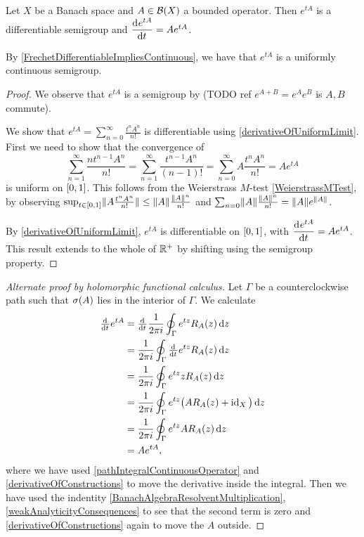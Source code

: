 \begin{proposition} \label{exponentialDifferentiableSemigroup}
Let $X$ be a Banach space and $A\in\operatorname{\mathcal{B}}(X)$ a bounded operator. Then $e^{tA}$ is a differentiable semigroup and $\mathinner{ \dfrac{\operatorname{d \!}{^{}}e^{tA}}{\operatorname{d \!}{{t}^{}}} } = Ae^{tA}$.
\end{proposition}
By \ref{FrechetDifferentiableImpliesContinuous}, we have that $e^{tA}$ is a uniformly continuous semigroup.
\begin{proof}
We observe that $e^{tA}$ is a semigroup by (TODO ref $e^{A+B} = e^Ae^B$ is $A,B$ commute).

We show that $e^{tA} = \sum_{n=0}^\infty \frac{t^nA^n}{n!}$ is differentiable using \ref{derivativeOfUniformLimit}. First we need to show that the convergence of
\[ \sum_{n=1}^\infty \frac{nt^{n-1}A^n}{n!} = \sum_{n=1}^\infty \frac{t^{n-1}A^n}{(n-1)!} = \sum_{n=0}^\infty A\frac{t^{n}A^n}{n!} = Ae^{tA} \]
is uniform on $\interval{0,1}$. This follows from the Weierstrass $M$-test \ref{WeierstrassMTest}, by observing $\sup_{t\in \interval{0,1}}\norm{A\frac{t^{n}A^n}{n!}} \leq \norm{A}\frac{\norm{A}^n}{n!}$ and $\sum_{n=0} \lVert A\rVert\frac{\lVert A\rVert^n}{n!} = \lVert A\rVert e^{\lVert A\rVert}$.

By \ref{derivativeOfUniformLimit}, $e^{tA}$ is differentiable on $\interval{0,1}$, with $\mathinner{ \dfrac{\operatorname{d \!}{^{}}e^{tA}}{\operatorname{d \!}{{t}^{}}} } = Ae^{tA}$. This result extends to the whole of $\mathbb{R}^+$ by shifting using the semigroup property.
\end{proof}
\begin{proof}[Alternate proof by holomorphic functional calculus]
Let $\Gamma$ be a counterclockwise path such that $\sigma(A)$ lies in the interior of $\Gamma$. We calculate
\begin{align*}
\od{}{t}e^{tA} &= \od{}{t}\frac{1}{2\pi i}\oint_\Gamma e^{tz}R_{A}(z)\diff{z} \\
&= \frac{1}{2\pi i}\oint_\Gamma \od{}{t}e^{tz}R_{A}(z)\diff{z} \\
&= \frac{1}{2\pi i}\oint_\Gamma e^{tz}zR_{A}(z)\diff{z} \\
&= \frac{1}{2\pi i}\oint_\Gamma e^{tz}\big(AR_A(z) + \id_X\big)\diff{z} \\
&= \frac{1}{2\pi i}\oint_\Gamma e^{tz}AR_A(z)\diff{z} \\
&= Ae^{tA},
\end{align*}
where we have used \ref{pathIntegralContinuousOperator} and \ref{derivativeOfConstructions} to move the derivative inside the integral. Then we have used the indentity \ref{BanachAlgebraResolventMultiplication}, \ref{weakAnalyticityConsequences} to see that the second term is zero and \ref{derivativeOfConstructions} again to move the $A$ outside.
\end{proof}

